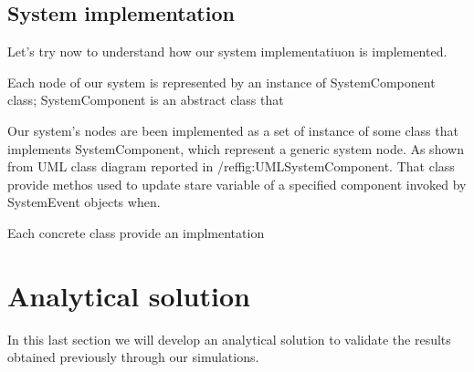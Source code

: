 \documentclass[10pt,a4paper]{article}
\begin{document}
\subsection{System implementation}

Let's try now to understand how our system implementatiuon is implemented.

Each node of our system is represented by an instance of SystemComponent class; 
SystemComponent is an abstract class that 

Our system's nodes are been implemented as a set of instance of some class that implements SystemComponent, which represent a generic system node. As shown from UML class diagram reported in /ref{fig:UMLSystemComponent}. 
That class provide methos used to update stare variable of a specified component invoked by SystemEvent objects when.


Each concrete class provide an implmentation 






\newpage
\section{Analytical solution}

In this last section we will develop an analytical solution to validate the results obtained previously through our simulations. 
\end{document}
